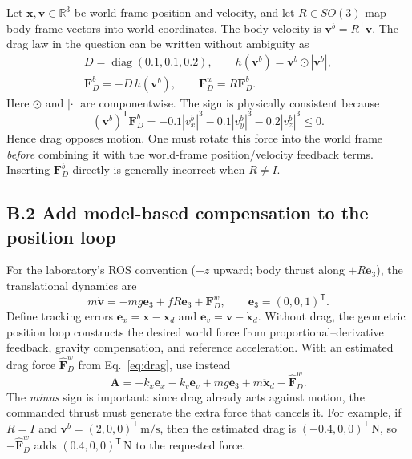 \documentclass[10pt,a4paper]{article}
\newcommand{\eThree}{\mathbf e_3}
\begin{document}
Let $\mathbf x,\mathbf v\in\mathbb R^3$ be world-frame position and velocity, and let $R\in SO(3)$ map body-frame vectors into world coordinates. The body velocity is $\mathbf v^b=R^\mathsf T\mathbf v$. The drag law in the question can be written without ambiguity as
\begin{equation}
\begin{gathered}
D=\operatorname{diag}(0.1,0.1,0.2),\qquad
h(\mathbf v^b)=\mathbf v^b\odot|\mathbf v^b|,\\
\boxed{\mathbf F_D^b=-D\,h(\mathbf v^b)},\qquad
\boxed{\mathbf F_D^w=R\mathbf F_D^b}.
\end{gathered}
\label{eq:drag}
\end{equation}
Here $\odot$ and $|\cdot|$ are componentwise. The sign is physically consistent because
\begin{equation}
(\mathbf v^b)^\mathsf T\mathbf F_D^b
=-0.1|v_x^b|^3-0.1|v_y^b|^3-0.2|v_z^b|^3\leq0.
\label{eq:dissipative}
\end{equation}
Hence drag opposes motion. One must rotate this force into the world frame \emph{before} combining it with the world-frame position/velocity feedback terms. Inserting $\mathbf F_D^b$ directly is generally incorrect when $R\ne I$.

\subsection*{B.2 Add model-based compensation to the position loop}

For the laboratory's ROS convention ($+z$ upward; body thrust along $+R\eThree$), the translational dynamics are
\begin{equation}
 m\dot{\mathbf v}=-mg\eThree+fR\eThree+\mathbf F_D^w,
 \qquad \eThree=(0,0,1)^\mathsf T.
\label{eq:dynamics}
\end{equation}
Define tracking errors $\mathbf e_x=\mathbf x-\mathbf x_d$ and $\mathbf e_v=\mathbf v-\dot{\mathbf x}_d$. Without drag, the geometric position loop constructs the desired world force from proportional--derivative feedback, gravity compensation, and reference acceleration. With an estimated drag force $\widehat{\mathbf F}_D^w$ from Eq.~\eqref{eq:drag}, use instead
\begin{equation}
\boxed{\mathbf A=-k_x\mathbf e_x-k_v\mathbf e_v
          +mg\eThree+m\ddot{\mathbf x}_d
          -\widehat{\mathbf F}_D^w.}
\label{eq:A}
\end{equation}
The \emph{minus} sign is important: since drag already acts against motion, the commanded thrust must generate the extra force that cancels it. For example, if $R=I$ and $\mathbf v^b=(2,0,0)^\mathsf T\,\mathrm{m/s}$, then the estimated drag is $(-0.4,0,0)^\mathsf T\,\mathrm N$, so $-\widehat{\mathbf F}_D^w$ adds $(0.4,0,0)^\mathsf T\,\mathrm N$ to the requested force.
\end{document}

